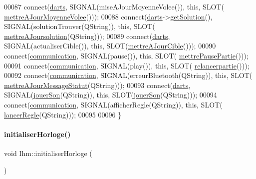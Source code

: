 \begin{DoxyCode}
00087     connect(\hyperlink{class_ihm_a2a0f54d33f4d6b2531ec2190c4a2356e}{darts}, SIGNAL(miseAJourMoyenneVolee()), \textcolor{keyword}{this}, SLOT(
      \hyperlink{class_ihm_abafc4398a910be8ab95a75fbdf176426}{mettreAJourMoyenneVolee}()));
00088     connect(\hyperlink{class_ihm_a2a0f54d33f4d6b2531ec2190c4a2356e}{darts}->\hyperlink{class_darts_a2e41c247a12dfd3065c77c2484fc5532}{getSolution}(), SIGNAL(solutionTrouver(QString)), \textcolor{keyword}{this}, SLOT(
      \hyperlink{class_ihm_a27b24d133887431399b4696a4eae02e6}{mettreAJoursolution}(QString)));
00089     connect(\hyperlink{class_ihm_a2a0f54d33f4d6b2531ec2190c4a2356e}{darts}, SIGNAL(actualiserCible()), \textcolor{keyword}{this}, SLOT(\hyperlink{class_ihm_a3c504c417aa2d3efd82ac5feded16895}{mettreAJourCible}()));
00090     connect(\hyperlink{class_ihm_a2f3d4781795781a840786cd8c2233899}{communication}, SIGNAL(pause()), \textcolor{keyword}{this}, SLOT(
      \hyperlink{class_ihm_ab8456da276715f99ba373b71313592de}{mettrePausePartie}()));
00091     connect(\hyperlink{class_ihm_a2f3d4781795781a840786cd8c2233899}{communication}, SIGNAL(play()), \textcolor{keyword}{this}, SLOT(
      \hyperlink{class_ihm_a3480957ba23548b30dddc717f6cfa577}{relancerpartie}()));
00092     connect(\hyperlink{class_ihm_a2f3d4781795781a840786cd8c2233899}{communication}, SIGNAL(erreurBluetooth(QString)), \textcolor{keyword}{this}, SLOT(
      \hyperlink{class_ihm_ab80e655c95fca8e1113343bdbd3d3586}{mettreAJourMessageStatut}(QString)));
00093     connect(\hyperlink{class_ihm_a2a0f54d33f4d6b2531ec2190c4a2356e}{darts}, SIGNAL(\hyperlink{class_ihm_a55f2d106f7af9ed2e84f78822e23bb97}{jouerSon}(QString)), \textcolor{keyword}{this}, SLOT(\hyperlink{class_ihm_a55f2d106f7af9ed2e84f78822e23bb97}{jouerSon}(QString)));
00094     connect(\hyperlink{class_ihm_a2f3d4781795781a840786cd8c2233899}{communication}, SIGNAL(afficherRegle(QString)), \textcolor{keyword}{this}, SLOT(
      \hyperlink{class_ihm_a5186bc159a8bf1fa359da4f4ccd78f5a}{lancerRegle}(QString)));
00095 
00096 \}
\end{DoxyCode}
\mbox{\label{class_ihm_aa5a3e97de39e919ea8807d30167da510}} 
\paragraph{\texorpdfstring{initialiser\+Horloge()}{initialiserHorloge()}}
{\footnotesize\ttfamily void Ihm\+::initialiser\+Horloge (\begin{DoxyParamCaption}{ }\end{DoxyParamCaption})\hspace{0.3cm}{\ttfamily [private]}}




